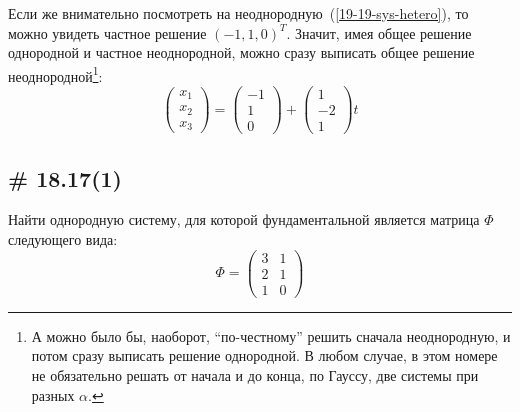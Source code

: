 \documentclass[a4paper,12pt]{article}
\begin{document}
\begin{solution}
    Если же внимательно посмотреть на неоднородную~(\ref{19-19-sys-hetero}), то можно увидеть частное решение $(-1, 1, 0)^T$.
    Значит, имея общее решение однородной и частное неоднородной, можно сразу выписать общее решение неоднородной\footnote{А можно было бы, наоборот, ``по-честному'' решить сначала неоднородную, и потом сразу выписать решение однородной. В любом случае, в этом номере не обязательно решать от начала и до конца, по Гауссу, две системы при разных $\alpha$.}:
    \[
      \begin{pmatrix}
        x_1\\
        x_2\\
        x_3
      \end{pmatrix} = \begin{pmatrix}
        -1\\
        1\\
        0
      \end{pmatrix} + \begin{pmatrix}
        1\\
        -2\\
        1
      \end{pmatrix} t
    \]
  \end{solution}

  
  \newpage
  
  \subsection{\# 18.17(1)}
  
  Найти однородную систему, для которой фундаментальной является матрица $\Phi$ следующего вида:
  \[
    \Phi = \begin{pmatrix}
      3 & 1\\
      2 & 1\\
      1 & 0
    \end{pmatrix}
  \]
  
\end{document}

